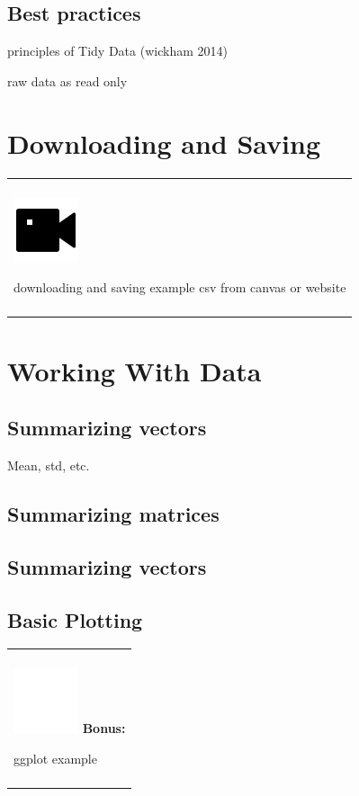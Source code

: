 \documentclass[
]{book}
\newenvironment{bonus}
{
  \begin{center}
  \begin{tabular}{|>{\columncolor{bonus}\color{white}}p{0.9\textwidth}|}\hline\\
  \includegraphics[scale=0.1]{src/images/sun-fill-invert.png}
  \textbf{Bonus:}
}
{\\\\\hline
  \end{tabular}
  \end{center}
}
\newenvironment{video}
{
  \begin{center}
  \begin{tabular}{|>{\columncolor{video}}p{0.9\textwidth}|}
  \hline\\
  \includegraphics[scale=0.1]{src/images/vidicon-fill.png}
}
{\\\\\hline
  \end{tabular}
  \end{center}
}
\begin{document}
\hypertarget{best-practices}{%
\subsection{Best practices}\label{best-practices}}

principles of Tidy Data (wickham 2014)

raw data as read only

\hypertarget{downloading-and-saving}{%
\section{Downloading and Saving}\label{downloading-and-saving}}

\begin{video}
downloading and saving example csv from canvas or website
\end{video}

\hypertarget{working-with-data}{%
\section{Working With Data}\label{working-with-data}}

\hypertarget{summarizing-vectors}{%
\subsection{Summarizing vectors}\label{summarizing-vectors}}

Mean, std, etc.

\hypertarget{summarizing-matrices}{%
\subsection{Summarizing matrices}\label{summarizing-matrices}}

\hypertarget{summarizing-vectors-1}{%
\subsection{Summarizing vectors}\label{summarizing-vectors-1}}

\hypertarget{basic-plotting}{%
\subsection{Basic Plotting}\label{basic-plotting}}

\begin{bonus}
ggplot example
\end{bonus}
\end{document}
